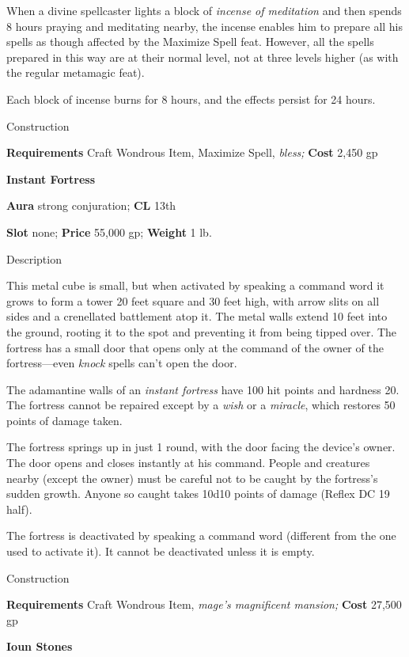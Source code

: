 When a divine spellcaster lights a block of \textit{incense of meditation} and then spends 8 hours praying and meditating nearby, the incense enables him to prepare all his spells as though affected by the Maximize Spell feat. However, all the spells prepared in this way are at their normal level, not at three levels higher (as with the regular metamagic feat).
				
Each block of incense burns for 8 hours, and the effects persist for 24 hours. 
				
Construction
				
\textbf{Requirements} Craft Wondrous Item, Maximize Spell,\textit{ bless;}\textbf{ Cost }2,450 gp
				
\textbf{Instant Fortress}
				
\textbf{Aura} strong conjuration;\textbf{ CL }13th
				
\textbf{Slot} none; \textbf{Price} 55,000 gp; \textbf{Weight }1 lb.
				
Description
				
This metal cube is small, but when activated by speaking a command word it grows to form a tower 20 feet square and 30 feet high, with arrow slits on all sides and a crenellated battlement atop it. The metal walls extend 10 feet into the ground, rooting it to the spot and preventing it from being tipped over. The fortress has a small door that opens only at the command of the owner of the fortress---even \textit{knock} spells can't open the door.
				
The adamantine walls of an \textit{instant fortress} have 100 hit points and hardness 20. The fortress cannot be repaired except by a \textit{wish} or a \textit{miracle}, which restores 50 points of damage taken.
				
The fortress springs up in just 1 round, with the door facing the device's owner. The door opens and closes instantly at his command. People and creatures nearby (except the owner) must be careful not to be caught by the fortress's sudden growth. Anyone so caught takes 10d10 points of damage (Reflex DC 19 half).
				
The fortress is deactivated by speaking a command word (different from the one used to activate it). It cannot be deactivated unless it is empty. 
				
Construction
				
\textbf{Requirements} Craft Wondrous Item,\textit{ mage's magnificent mansion;}\textbf{ Cost }27,500 gp
				
\textbf{Ioun Stones}
				
